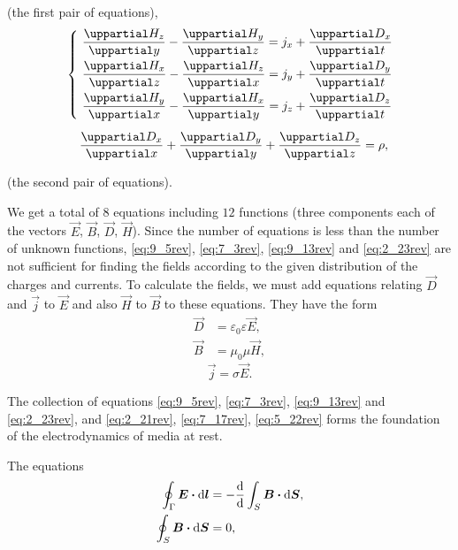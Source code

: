 \noindent
(the first pair of equations),
\begin{align}
    & \begin{cases}
        &\!\!\!\! \diffpartial{H_z}{y} - \diffpartial{H_y}{z} = j_x + \diffpartial{D_x}{t}\\[8pt]
        &\!\!\!\! \diffpartial{H_x}{z} - \diffpartial{H_z}{x} = j_y + \diffpartial{D_y}{t}\\[8pt]
        &\!\!\!\! \diffpartial{H_y}{x} - \diffpartial{H_x}{y} = j_z + \diffpartial{D_z}{t}
    \end{cases}\label{eq:9_17}\\[5pt]
    & \quad\,\diffpartial{D_x}{x} + \diffpartial{D_y}{y} + \diffpartial{D_z}{z} = \rho,\label{eq:9_18}
\end{align}

\noindent
(the second pair of equations).

We get a total of $8$ equations including $12$ functions (three components each of the vectors $\vec{E}$, $\vec{B}$, $\vec{D}$, $\vec{H}$).
Since the number of equations is less than the number of unknown functions, \eqref{eq:9_5rev}, \eqref{eq:7_3rev}, \eqref{eq:9_13rev} and \eqref{eq:2_23rev} are not sufficient for finding the fields according to the given distribution of the charges and currents.
To calculate the fields, we must add equations relating $\vec{D}$ and $\vec{j}$ to $\vec{E}$ and also $\vec{H}$ to $\vec{B}$ to these equations.
They have the form
\begin{align}
    \vec{D} &= \varepsilon_0\varepsilon \vec{E}, \label{eq:2_21rev}\tag{2.21}\\
    \vec{B} &= \mu_0\mu \vec{H}, \label{eq:7_17rev}\tag{7.17}
\end{align}
\begin{equation}\label{eq:5_22rev}
    \vec{j} = \sigma \vec{E}. \tag{5.22}
\end{equation}

The collection of equations \eqref{eq:9_5rev}, \eqref{eq:7_3rev}, \eqref{eq:9_13rev} and \eqref{eq:2_23rev}, and \eqref{eq:2_21rev},
\eqref{eq:7_17rev}, \eqref{eq:5_22rev} forms the foundation of the electrodynamics of media at rest.

The equations
\begin{align}
    \oint_{\Gamma} \boldsymbol{E} \boldsymbol{\cdot} \mathrm{d}\boldsymbol{l} &= - \dfrac{\mathrm{d}}{\mathrm{d}} \int_S \boldsymbol{B} \boldsymbol{\cdot} \mathrm{d}\boldsymbol{S}, \label{eq:9_19}\\
    \oint_S \boldsymbol{B} \boldsymbol{\cdot} \mathrm{d}\boldsymbol{S} &= 0, \label{eq:9_20}
\end{align}

